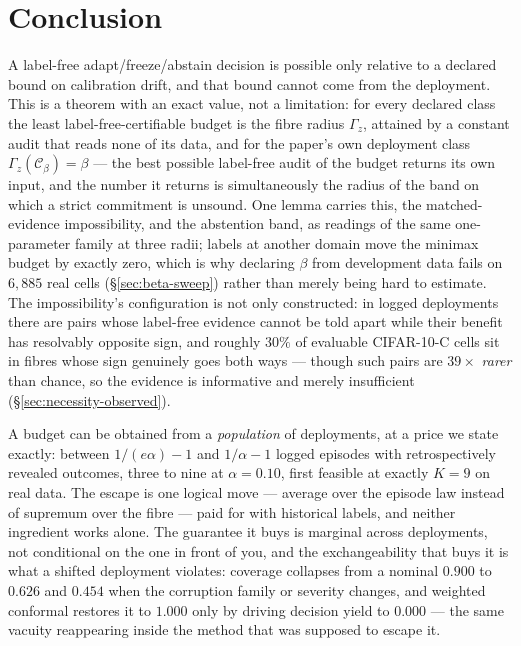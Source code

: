 \section{Conclusion}
A label-free adapt/freeze/abstain decision is possible only relative to a declared bound on
calibration drift, and that bound cannot come from the deployment. This is a theorem with an exact
value, not a limitation: for every declared class the least label-free-certifiable budget is the
fibre radius $\Gamma_z$, attained by a constant audit that reads none of its data, and for the
paper's own deployment class $\Gamma_z(\mathcal C_\beta)=\beta$ --- the best possible label-free
audit of the budget returns its own input, and the number it returns is simultaneously the radius of
the band on which a strict commitment is unsound. One lemma carries this, the matched-evidence
impossibility, and the abstention band, as readings of the same one-parameter family at three radii;
labels at another domain move the minimax budget by exactly zero, which is why declaring $\beta$
from development data fails on $6{,}885$ real cells (\S\ref{sec:beta-sweep}) rather than merely
being hard to estimate. The impossibility's configuration is not only constructed: in logged
deployments there are pairs whose label-free evidence cannot be told apart while their benefit has
resolvably opposite sign, and roughly $30\%$ of evaluable CIFAR-10-C cells sit in fibres whose
sign genuinely goes both ways --- though such pairs are $39\times$ \emph{rarer} than chance, so the
evidence is informative and merely insufficient (\S\ref{sec:necessity-observed}).

A budget can be obtained from a \emph{population} of deployments, at a price we state exactly:
between $1/(e\alpha)-1$ and $1/\alpha-1$ logged episodes with retrospectively revealed outcomes,
three to nine at $\alpha=0.10$, first feasible at exactly $K=9$ on real data. The escape is one
logical move --- average over the episode law instead of supremum over the fibre --- paid for with
historical labels, and neither ingredient works alone. The guarantee it buys is marginal across
deployments, not conditional on the one in front of you, and the exchangeability that buys it is
what a shifted deployment violates: coverage collapses from a nominal $0.900$ to $0.626$ and
$0.454$ when the corruption family or severity changes, and weighted conformal restores it to
$1.000$ only by driving decision yield to $0.000$ --- the same vacuity reappearing inside the method
that was supposed to escape it.

